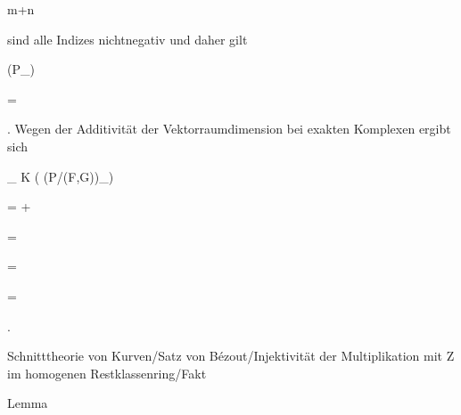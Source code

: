 {\mavergleichskette

{\vergleichskette

{ \ell
}

{ \geq }{ m+n
}

{  }{
}

{    }{
}

{   }{
}

}
{}{}{}
sind alle Indizes nichtnegativ und daher gilt


\mavergleichskette

{\vergleichskette

{ \dim (P_\ell)
}

{ = }{ 
}

{  }{
}

{    }{
}

{   }{
}

}
{}{}{.}
Wegen der Additivität der Vektorraumdimension bei exakten Komplexen
 {} {}
ergibt sich


\mavergleichskettealigndrucklinks

{\vergleichskettealigndrucklinks

{ \dim_{ K } \left(    (P/(F,G))_\ell   \right)
}

{ =} {  {+ } }

{ =} {  {} }

{ =} {  {} }

{ =} {  {} }

}
{}{}{.}


}



{Schnitttheorie von Kurven/Satz von Bézout/Injektivität der Multiplikation mit Z im homogenen Restklassenring/Fakt}

{Lemma}

{}

